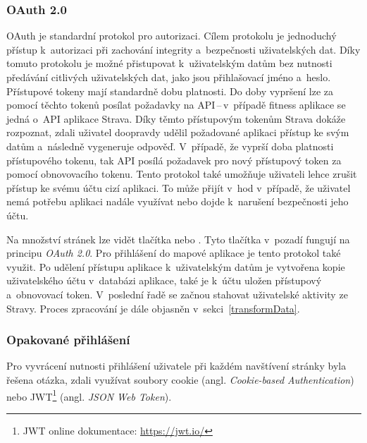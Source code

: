\subsubsection{OAuth 2.0}
\label{oauth}
OAuth je standardní protokol pro autorizaci. Cílem protokolu je jednoduchý přístup k~autorizaci při zachování integrity a~bezpečnosti uživatelských dat. Díky tomuto protokolu je možné přistupovat k~uživatelským datům bez nutnosti předávání citlivých uživatelských dat, jako jsou přihlašovací jméno a~heslo.
Přístupové tokeny mají standardně dobu platnosti. Do doby vypršení lze za pomocí těchto tokenů posílat požadavky na API\,--\,v~případě fitness aplikace se jedná o~API aplikace Strava. Díky těmto přístupovým tokenům Strava dokáže rozpoznat, zdali uživatel doopravdy udělil požadované aplikaci přístup ke svým datům a~následně vygeneruje odpověď. 
V~případě, že vyprší doba platnosti přístupového tokenu, tak API posílá požadavek pro nový přístupový token za pomocí obnovovacího tokenu. Tento protokol také umožňuje uživateli lehce zrušit přístup ke svému účtu cizí aplikaci. To může přijít v~hod v~případě, že uživatel nemá potřebu aplikaci nadále využívat nebo dojde k~narušení bezpečnosti jeho účtu.~\cite{OAuth}

Na množství stránek lze vidět tlačítka  nebo . Tyto tlačítka v~pozadí fungují na principu \emph{OAuth 2.0}. Pro přihlášení do mapové aplikace je tento protokol také využit. Po udělení přístupu aplikace k~uživatelským datům je vytvořena kopie uživatelského účtu v~databázi aplikace, také je k~účtu uložen přístupový a~obnovovací token. V~poslední řadě se začnou stahovat uživatelské aktivity ze Stravy. Proces zpracování je dále objasněn v~sekci~\ref{transformData}. 

\subsubsection{Opakované přihlášení}
Pro vyvrácení nutnosti přihlášení uživatele při každém navštívení stránky byla řešena otázka, zdali využívat soubory cookie (angl. \emph{Cookie-based Authentication}) nebo JWT\footnote{JWT online dokumentace: \url{https://jwt.io/}} (angl. \emph{JSON Web Token}). \cite{CookieVsJWT}

